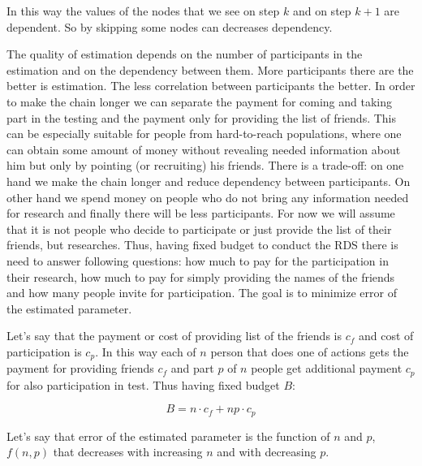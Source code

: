 \documentclass[12pt]{report}
\begin{document}
In this way the values of the nodes that we see on step $k$ and on step $k + 1$ are dependent. So by skipping some nodes can decreases dependency. 


The quality of estimation depends on the number of participants in the estimation and on the dependency between them. More participants there are the better is estimation. The less correlation between participants the better.
In order to make the chain longer we can separate the payment for coming and taking part in the testing and the payment only for providing the list of friends.
This can be especially suitable for people from hard-to-reach populations, where one can obtain some amount of money without revealing needed information about him but only by pointing (or recruiting) his friends. There is a trade-off: on one hand we make the chain longer and reduce dependency between participants. On other hand we spend money on people who do not bring any information needed for research and finally there will be less participants. 
For now we will assume that it is not people who decide to participate or just provide the list of their friends, but researches. Thus, having fixed budget to conduct the RDS there is need to answer following questions: how much to pay for the participation in their research, how much to pay for simply providing the names of the friends and how many people invite for participation. The goal is to minimize error of the estimated parameter.

Let's say that the payment or cost of providing list of the friends is $c_f$ and cost of participation is $c_p$. In this way each of $n$ person that does one of actions gets the payment for providing friends $c_f$ and part $p$ of $n$ people get additional payment $c_p$ for also participation in test.
Thus having fixed budget $B$:

$$B = n \cdot c_f + np \cdot c_p$$

Let's say that error of the estimated parameter is the function of $n$ and $p$, $f(n,p)$ that decreases with increasing $n$ and with decreasing $p$.
\end{document}
